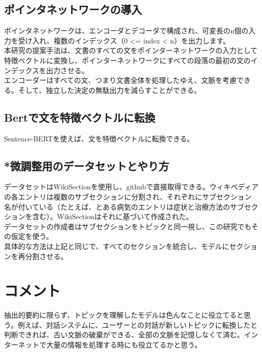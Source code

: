 \documentclass[a4paper]{article}
\begin{document}
\subsection{ポインタネットワークの導入}

ポインタネットワークは、エンコーダとデコーダで構成され、可変長のn個の入力を受け入れ、複数のインデックス（0 <= index < n）を出力します。\\

本研究の提案手法は、文書のすべての文をポインターネットワークの入力として特徴ベクトルに変換し、ポインターネットワークにすべての段落の最初の文のインデックスを出力させる。\\

エンコーダーはすべての文、つまり文書全体を処理したゆえ、文脈を考慮できる。そして、独立した決定の無駄出力を減らすことができる。\\

\subsection{Bertで文を特徴ベクトルに転換}

Sentence-BERTを使えば、文を特徴ベクトルに転換できる。

\subsection{*微調整用のデータセットとやり方}

データセットはWikiSectionを使用し、githubで直接取得できる。ウィキペディアの各エントリは複数のサブセクションに分割され、それぞれにサブセクション名が付いている（たとえば、とある病気のエントリは症状と治療方法のサブセクションを含む）。WikiSectionはそれに基づいて作成された。\\

データセットの作成者はサブセクションをトピックと同一視し、この研究でもその仮定を使う。\\

具体的な方法は上記と同じで、すべてのセクションを統合し、モデルにセクションを再分割させる。\\

\section{コメント}

抽出的要約に限らず、トピックを理解したモデルは色んなことに役立てると思う。例えば、対話システムに、ユーザーとの対話が新しいトピックに転換したと判断できれば、古い文脈の破棄ができる、全部の文脈を記憶しなくて済む。インターネットで大量の情報を処理する時にも役立てるかと思う。
\end{document}
